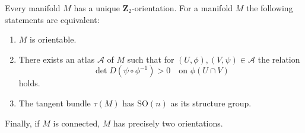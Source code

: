 Every manifold $M$ has a unique $\mathbf{Z}_2$-orientation. For a manifold $M$ the following statements are equivalent:

\begin{enumerate}
\item[(1)] $M$ is orientable.
\item[(2)] There exists an atlas $\mathcal{A}$ of $M$ such that for $(U, \phi), (V, \psi) \in \mathcal{A}$ the relation
  $$\det D(\psi \circ \phi^{-1}) > 0 \quad \text{on } \phi(U \cap V)$$
  holds.
\item[(3)] The tangent bundle $\tau(M)$ has $\mathrm{SO}(n)$ as its structure group.
\end{enumerate}

Finally, if $M$ is connected, $M$ has precisely two orientations.
